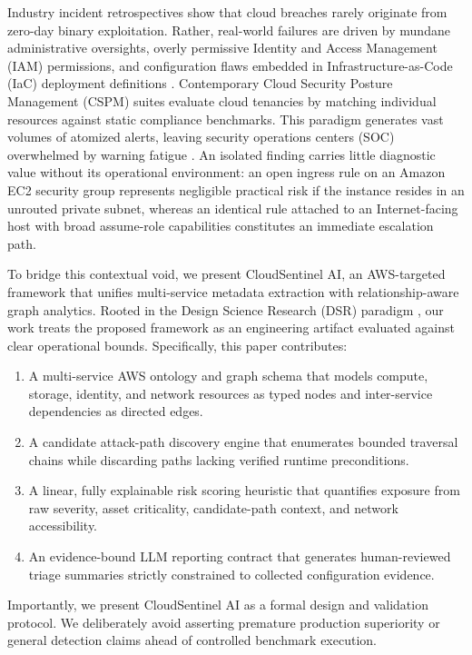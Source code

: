 \documentclass[conference]{IEEEtran}
\begin{document}
Industry incident retrospectives show that cloud breaches rarely originate from zero-day binary exploitation. Rather, real-world failures are driven by mundane administrative oversights, overly permissive Identity and Access Management (IAM) permissions, and configuration flaws embedded in Infrastructure-as-Code (IaC) deployment definitions \cite{liu2024misconfigurations,rahman2019icsesmells}. Contemporary Cloud Security Posture Management (CSPM) suites evaluate cloud tenancies by matching individual resources against static compliance benchmarks. This paradigm generates vast volumes of atomized alerts, leaving security operations centers (SOC) overwhelmed by warning fatigue \cite{vanede2022iam}. An isolated finding carries little diagnostic value without its operational environment: an open ingress rule on an Amazon EC2 security group represents negligible practical risk if the instance resides in an unrouted private subnet, whereas an identical rule attached to an Internet-facing host with broad assume-role capabilities constitutes an immediate escalation path.

To bridge this contextual void, we present CloudSentinel AI, an AWS-targeted framework that unifies multi-service metadata extraction with relationship-aware graph analytics. Rooted in the Design Science Research (DSR) paradigm \cite{hevner2004design}, our work treats the proposed framework as an engineering artifact evaluated against clear operational bounds. Specifically, this paper contributes:
\begin{enumerate}
\item A multi-service AWS ontology and graph schema that models compute, storage, identity, and network resources as typed nodes and inter-service dependencies as directed edges.
\item A candidate attack-path discovery engine that enumerates bounded traversal chains while discarding paths lacking verified runtime preconditions.
\item A linear, fully explainable risk scoring heuristic that quantifies exposure from raw severity, asset criticality, candidate-path context, and network accessibility.
\item An evidence-bound LLM reporting contract that generates human-reviewed triage summaries strictly constrained to collected configuration evidence.
\end{enumerate}

Importantly, we present CloudSentinel AI as a formal design and validation protocol. We deliberately avoid asserting premature production superiority or general detection claims ahead of controlled benchmark execution.
\end{document}
